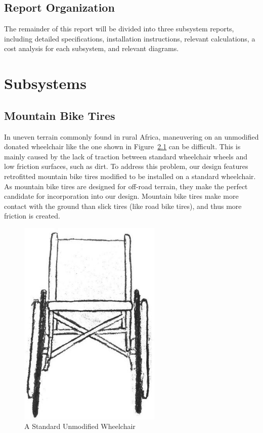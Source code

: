 \documentclass[12pt]{report}
\begin{document}
\section{Report Organization}

The remainder of this report will be divided into three subsystem reports,
including detailed specifications, installation instructions, relevant
calculations, a cost analysis for each subsystem, and relevant diagrams.

\chapter{Subsystems}

\section{Mountain Bike Tires}

In uneven terrain commonly found in rural Africa, maneuvering on an unmodified
donated wheelchair like the one shown in Figure~\ref{fig:tires-wheelchair} can
be difficult. This is mainly caused by the lack of
traction between standard wheelchair wheels and low friction surfaces, such as
dirt. To address this problem, our design features retrofitted mountain bike
tires modified to be installed on a standard wheelchair. As mountain bike tires
are designed for off-road terrain, they make the perfect candidate for
incorporation into our design. Mountain bike tires make more contact with the
ground than slick tires (like road bike tires), and thus more friction is
created\cite{exploratorium}.

\begin{figure}[H]
    \centering
    \includegraphics[height=10cm]{tires/wheelchair}
    \caption{A Standard Unmodified Wheelchair}
    \label{fig:tires-wheelchair}
\end{figure}
\end{document}
